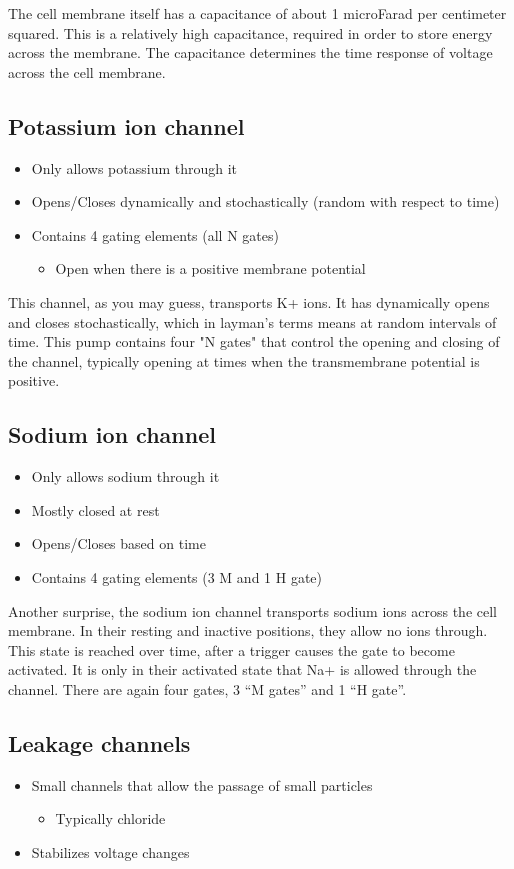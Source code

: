 \documentclass[11pt]{book}
\begin{document}
The cell membrane itself has a capacitance of about 1 microFarad per centimeter squared. This is a relatively high capacitance, required in order to store energy across the membrane. The capacitance determines the time response of voltage across the cell membrane. 

\subsection{Potassium ion channel}
\begin{itemize}
	\item Only allows potassium through it
	\item Opens/Closes dynamically and stochastically (random with respect to time)
	\item Contains 4 gating elements (all N gates)
	\begin {itemize}
		\item Open when there is a positive membrane potential
	\end {itemize}
\end{itemize}

This channel, as you may guess, transports K+ ions. It has dynamically opens and closes stochastically, which in layman's terms means at random intervals of time. This pump contains four "N gates" that control the opening and closing of the channel, typically opening at times when the transmembrane potential is positive. 

\subsection{Sodium ion channel}
\begin{itemize}
	\item Only allows sodium through it
	\item Mostly closed at rest
	\item Opens/Closes based on time
	\item Contains 4 gating elements (3 M and 1 H gate)
\end{itemize}

Another surprise, the sodium ion channel transports sodium ions across the cell membrane. In their resting and inactive positions, they allow no ions through. This state is reached over time, after a trigger causes the gate to become activated. It is only in their activated state that Na+ is allowed through the channel. There are again four gates, 3 ``M gates'' and 1 ``H gate''. 

\subsection{Leakage channels}
\begin{itemize}
	\item Small channels that allow the passage of small particles
	\begin{itemize}
		\item Typically chloride
	\end{itemize}
	\item Stabilizes voltage changes
\end{itemize}
\end{document}

